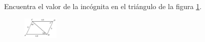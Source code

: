 Encuentra el valor de la incógnita en el triángulo de la figura \ref{fig:angle_triangle_20}.

\begin{minipage}[t][][t]{0.35\textwidth}
    \begin{figure}[H]
\centering
            \includegraphics[width=0.15\textwidth]{../images/angle_triangle_20.png}

        \caption{}
        \label{fig:angle_triangle_20}
    \end{figure}
\end{minipage}\hfill
\begin{minipage}[t][][t]{0.6\textwidth}
    \begin{solutionbox}{4.5cm}

    \end{solutionbox}
\end{minipage}
